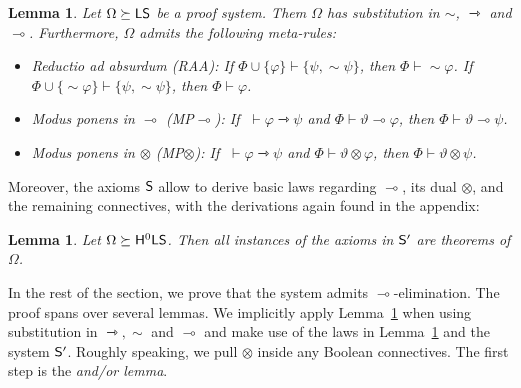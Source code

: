 \documentclass[a4paper,english,fleqn,11pt,final]{scrartcl}
\newcommand{\negg}{{\sim}}
\newcommand{\sfS}{\protect\ensuremath{\mathsf{S}}}
\newcommand{\sfH}{\protect\ensuremath{\mathsf{H}}}
\newcommand{\sfL}{\protect\ensuremath{\mathsf{L}}}
\newcommand{\limp}{\multimap}
\newcommand{\timp}{\rightarrowtriangle}
\newcommand{\tens}{\otimes}
\newcommand{\Deriv}[1]{{\normalfont\textsf{#1}}}
\theoremstyle{plain}
\newtheorem{lemma}[theorem]{Lemma}
\theoremstyle{definition}
\begin{document}
\begin{lemma}\label{lem:meta-ptl}
Let $\Omega \succeq \sfL\sfS$ be a proof system.
Them $\Omega$ has substitution in $\negg$, $\timp$ and $\limp$.
Furthermore, $\Omega$ admits the following meta-rules:
\begin{itemize}
	\item Reductio ad absurdum \Deriv{(RAA)}:
	If $\Phi \cup \{\varphi\} \vdash \{\psi, \negg \psi\}$, then $\Phi \vdash\negg\varphi$.
	If $\Phi \cup \{\negg\varphi\} \vdash \{\psi, \negg \psi\}$, then $\Phi \vdash \varphi$.
	\item Modus ponens in $\limp$ \Deriv{(MP$\limp$)}:
	If $\;\vdash \varphi \timp \psi$ and $\Phi \vdash \vartheta \limp \varphi$, then $\Phi \vdash \vartheta \limp \psi$.
	\item Modus ponens in $\tens$ \Deriv{(MP$\tens$)}:
	If $\;\vdash \varphi \timp \psi$ and $\Phi \vdash \vartheta \tens \varphi$, then $\Phi \vdash \vartheta \tens \psi$.
\end{itemize}
\end{lemma}





Moreover, the axioms $\sfS$ allow to derive basic laws regarding $\limp$, its dual $\tens$, and the remaining connectives, with the derivations again found in the appendix:


\begin{lemma}\label{lem:ptl-laws}
Let $\Omega \succeq \sfH^0\sfL\sfS$. Then all instances of the axioms in $\sfS'$ are theorems of $\Omega$.
\end{lemma}






In the rest of the section, we prove that the system admits $\limp$-elimination.
The proof spans over several lemmas.
We implicitly apply Lemma~\ref{lem:meta-ptl} when using substitution in $\timp, \negg$ and $\limp$ and make use of the laws in Lemma~\ref{lem:meta-ptl} and the system $\sfS'$.
Roughly speaking, we pull $\tens$ inside any Boolean connectives.
The first step is the \emph{and/or lemma}.
\end{document}
